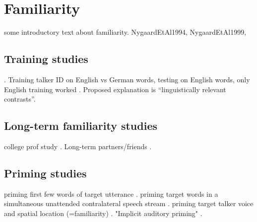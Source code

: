 

\section{Familiarity}
some introductory text about familiarity.  NygaardEtAl1994, NygaardEtAl1999, 

\subsection{Training studies\label{sec:Training}}
\citep{VanEngen2012}.  
Training talker ID on English vs German words, testing on English words, only English training worked \citep{LeviEtAl2011}.  Proposed explanation is “linguistically relevant contrasts”.

\subsection{Long-term familiarity studies}
college prof study \citep{NewmanEvers2007}.  Long-term partners/friends \citep{SouzaEtAl2013}.

\subsection{Priming studies}
priming first few words of target utterance \citep{FreymanEtAl2004}.  priming target words in a simultaneous unattended contralateral speech stream \citep{RivenezEtAl2006}.  priming target talker voice and spatial location (=familiarity) \citep{KiddEtAl2005a, KitterickEtAl2010}.  "Implicit auditory priming" \citep{Sommers1999}.

